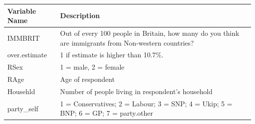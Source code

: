 \documentclass[]{article}
\begin{document}
\begin{longtable}[]{@{}ll@{}}
\toprule
\begin{minipage}[b]{0.11\columnwidth}\raggedright
Variable Name\strut
\end{minipage} & \begin{minipage}[b]{0.83\columnwidth}\raggedright
Description\strut
\end{minipage}\tabularnewline
\midrule
\endhead
\begin{minipage}[t]{0.11\columnwidth}\raggedright
IMMBRIT\strut
\end{minipage} & \begin{minipage}[t]{0.83\columnwidth}\raggedright
Out of every 100 people in Britain, how many do you think are immigrants from Non-western countries?\strut
\end{minipage}\tabularnewline
\begin{minipage}[t]{0.11\columnwidth}\raggedright
over.estimate\strut
\end{minipage} & \begin{minipage}[t]{0.83\columnwidth}\raggedright
1 if estimate is higher than 10.7\%.\strut
\end{minipage}\tabularnewline
\begin{minipage}[t]{0.11\columnwidth}\raggedright
RSex\strut
\end{minipage} & \begin{minipage}[t]{0.83\columnwidth}\raggedright
1 = male, 2 = female\strut
\end{minipage}\tabularnewline
\begin{minipage}[t]{0.11\columnwidth}\raggedright
RAge\strut
\end{minipage} & \begin{minipage}[t]{0.83\columnwidth}\raggedright
Age of respondent\strut
\end{minipage}\tabularnewline
\begin{minipage}[t]{0.11\columnwidth}\raggedright
Househld\strut
\end{minipage} & \begin{minipage}[t]{0.83\columnwidth}\raggedright
Number of people living in respondent's household\strut
\end{minipage}\tabularnewline
\begin{minipage}[t]{0.11\columnwidth}\raggedright
party\_self\strut
\end{minipage} & \begin{minipage}[t]{0.83\columnwidth}\raggedright
1 = Conservatives; 2 = Labour; 3 = SNP; 4 = Ukip; 5 = BNP; 6 = GP; 7 = party.other\strut

\end{minipage}
\end{longtable}
\end{document}
